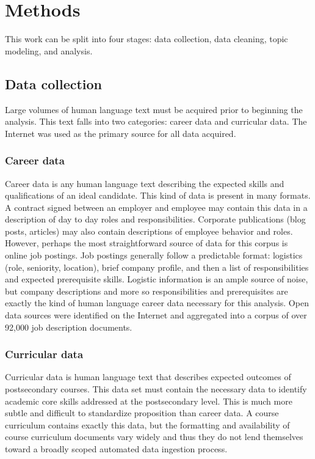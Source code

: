 \section{Methods}

This work can be split into four stages: data collection, data cleaning, topic modeling, and analysis.

\subsection{Data collection}

Large volumes of human language text must be acquired prior to beginning the analysis.
This text falls into two categories: career data and curricular data.
The Internet was used as the primary source for all data acquired.

\subsubsection{Career data}

Career data is any human language text describing the expected skills and qualifications of an ideal candidate.
This kind of data is present in many formats.
A contract signed between an employer and employee may contain this data in a description of day to day roles and responsibilities.
Corporate publications (blog posts, articles) may also contain descriptions of employee behavior and roles.
However, perhaps the most straightforward source of data for this corpus is online job postings.
Job postings generally follow a predictable format: logistics (role, seniority, location), brief company profile, and then a list of responsibilities and expected prerequisite skills.
Logistic information is an ample source of noise, but company descriptions and more so responsibilities and prerequisites are exactly the kind of human language career data necessary for this analysis.
Open data sources were identified on the Internet and aggregated into a corpus of over 92,000 job description documents.~\cite{data.world:promptcloud}


\subsubsection{Curricular data}

Curricular data is human language text that describes expected outcomes of postsecondary courses.
This data set must contain the necessary data to identify academic core skills addressed at the postsecondary level.
This is much more subtle and difficult to standardize proposition than career data.
A course curriculum contains exactly this data, but the formatting and availability of course curriculum documents vary widely and thus they do not lend themselves toward a broadly scoped automated data ingestion process.

